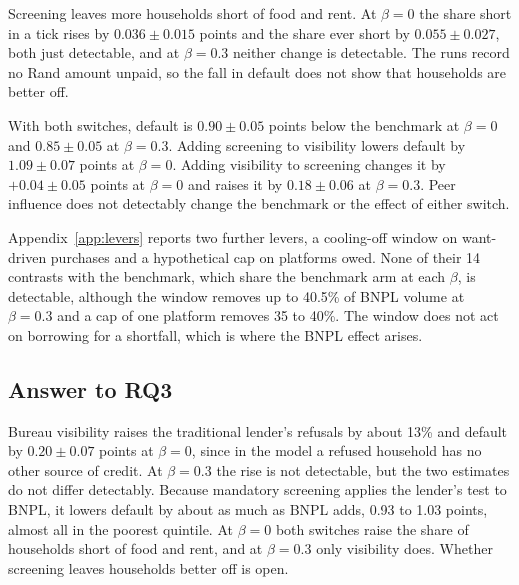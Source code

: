 Screening leaves more households short of food and rent. At
$\beta=0$ the share short in a tick rises by $0.036 \pm 0.015$ points and the share ever short by
$0.055 \pm 0.027$, both just detectable, and at $\beta=0.3$ neither change is detectable. The runs
record no Rand amount unpaid, so the fall in default does not show that households
are better off.

With both switches, default is $0.90 \pm 0.05$ points below the benchmark at $\beta=0$ and
$0.85 \pm 0.05$ at $\beta=0.3$. Adding screening to visibility lowers default by
$1.09 \pm 0.07$ points at $\beta=0$. Adding visibility to screening changes it by
$+0.04 \pm 0.05$ points at $\beta=0$ and raises it by $0.18 \pm 0.06$ at $\beta=0.3$. Peer
influence does not detectably change the benchmark or the effect of either switch.

Appendix~\ref{app:levers} reports two further levers, a cooling-off window on want-driven
purchases and a hypothetical cap on platforms owed. None of their
14 contrasts with the benchmark, which share the benchmark arm at each $\beta$, is
detectable, although the window removes up to 40.5\% of \ac{BNPL} volume at $\beta=0.3$ and a
cap of one platform removes 35 to 40\%. The window does not act on borrowing for a shortfall,
which is where the \ac{BNPL} effect arises.

\subsection{Answer to RQ3}
\label{sec:scenarios-answer}

Bureau visibility raises the traditional lender's refusals by about 13\% and default by
$0.20 \pm 0.07$ points at $\beta=0$, since in the model a refused household has no other source of credit. At $\beta=0.3$ the rise is not detectable, but the two estimates
do not differ detectably. Because mandatory screening applies the lender's test to \ac{BNPL}, it
lowers default by about as much as \ac{BNPL} adds, 0.93 to 1.03 points, almost all in the
poorest quintile. At $\beta=0$ both switches
raise the share of households short of food and rent, and at $\beta=0.3$ only visibility
does. Whether screening leaves households
better off is open.
